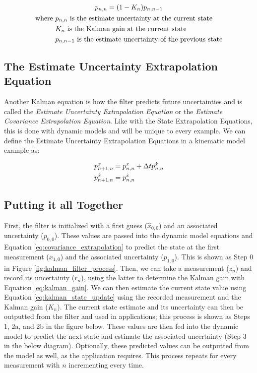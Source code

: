 \begin{gather}
    p_{n,n} = (1-K_n)p_{n,n-1} \\
    \begin{aligned}
        \text{where } &p_{n,n} \text{ is the estimate uncertainty at the current state} \\
                        &K_n \text{ is the Kalman gain at the current state} \\
                        &p_{n,n-1} \text{ is the estimate uncertainty of the previous state}
    \end{aligned} \notag
\end{gather}

\subsection{The Estimate Uncertainty Extrapolation Equation} 
Another Kalman equation is how the filter predicts future uncertainties and is called the \textit{Estimate Uncertainty Extrapolation Equation} or the \textit{Estimate Covariance Extrapolation Equation}.
Like with the State Extrapolation Equations, this is done with dynamic models and will be unique to every example.
We can define the Estimate Uncertainty Extrapolation Equations in a kinematic model example as:

\begin{gather}
    \labeq{covariance_extrapolation}
    \begin{aligned}
        p_{n+1,n}^x &= p_{n,n}^x + \Delta t p_{n,n}^{\dot{x}} \\
        p_{n+1,n}^{\dot{x}} &= p_{n,n}^{\dot{x}}
    \end{aligned}
\end{gather}

\subsection{Putting it all Together}
First, the filter is initialized with a first guess ($\hat{x}_{0,0}$) and an associated uncertainty ($p_{0,0}$).
These values are passed into the dynamic model equations and Equation \ref{eq:covariance_extrapolation} to predict the state at the first measurement ($x_{1,0}$) and the associated uncertainty ($p_{1,0}$).
This is shown as Step 0 in Figure \ref{fig:kalman_filter_process}.
Then, we can take a measurement ($z_n$) and record its uncertainty ($r_n$), using the latter to determine the Kalman gain with Equation \ref{eq:kalman_gain}.
We can then estimate the current state value using Equation \ref{eq:kalman_state_update} using the recorded measurement and the Kalman gain ($K_n$).
The current state estimate and its uncertainty can then be outputted from the filter and used in applications; this process is shown as Steps 1, 2a, and 2b in the figure below.
These values are then fed into the dynamic model to predict the next state and estimate the associated uncertainty (Step 3 in the below diagram).
Optionally, these predicted values can be outputted from the model as well, as the application requires.
This process repeats for every measurement with $n$ incrementing every time.

